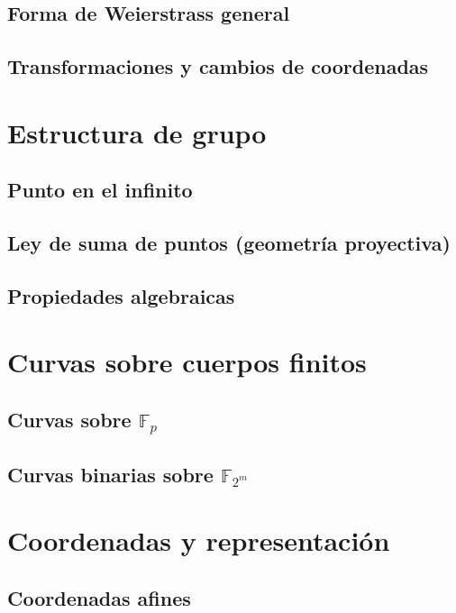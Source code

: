 \subsection{Forma de Weierstrass general}\label{sec:weierstrass_curvas_elipticas}
\subsection{Transformaciones y cambios de coordenadas}

\section{Estructura de grupo}
\subsection{Punto en el infinito}
\subsection{Ley de suma de puntos (geometría proyectiva)}
\subsection{Propiedades algebraicas}

\section{Curvas sobre cuerpos finitos}\label{sec:curvas_sobre_cuerpos_finitos}
\subsection{Curvas sobre \texorpdfstring{$\mathbb{F}_p$}{Fp}}\label{sec:curvas_sobre_cuerpos_finitos_primos}
\subsection{Curvas binarias sobre \texorpdfstring{$\mathbb{F}_{2^m}$}{F2m}}\label{sec:curvas_sobre_cuerpos_finitos_binarios}

\section{Coordenadas y representación}\label{sec:coordenadas_curvas_elipticas}
\subsection{Coordenadas afines}
